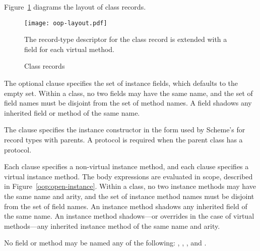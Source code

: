Figure~\ref{oop:records} diagrams the layout of class records.

\begin{figure}[p]
  \begin{center}
    \texttt{[image: oop-layout.pdf]}
  \end{center}
  The record-type descriptor for the class record is extended with a field for each
  virtual method.
  \caption{\label{oop:records}Class records}
\end{figure}

The optional  clause specifies the set of instance fields, which defaults to
the empty set. Within a class, no two fields may have the same name, and the set of field
names must be disjoint from the set of method names. A field shadows any inherited field
or method of the same name.

The  clause specifies the instance constructor in the form used by Scheme's
 for record types with parents. A protocol is required when the
parent class has a protocol.

Each  clause specifies a non-virtual instance method, and each 
clause specifies a virtual instance method. The body expressions are evaluated in
 scope, described in Figure~\ref{oop:open-instance}. Within a class, no
two instance methods may have the same name and arity, and the set of instance method
names must be disjoint from the set of field names. An instance method shadows any
inherited field of the same name. An instance method shadows---or overrides in the case of
virtual methods---any inherited instance method of the same name and arity.

No field or method may be named any of the following: , ,
, and .

